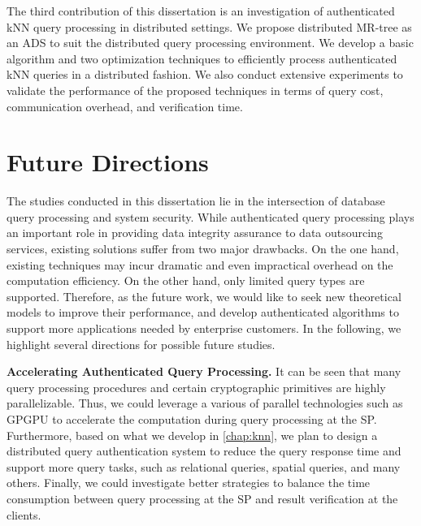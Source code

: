 The third contribution of this dissertation is an investigation of authenticated kNN query processing in distributed settings. We propose distributed MR-tree as an ADS to suit the distributed query processing environment. We develop a basic algorithm and two optimization techniques to efficiently process authenticated kNN queries in a distributed fashion. We also conduct extensive experiments to validate the performance of the proposed techniques in terms of query cost, communication overhead, and verification time.

\section{Future Directions}

The studies conducted in this dissertation lie in the intersection of database query processing and system security. While authenticated query processing plays an important role in providing data integrity assurance to data outsourcing services, existing solutions suffer from two major drawbacks. On the one hand, existing techniques may incur dramatic and even impractical overhead on the computation efficiency. On the other hand, only limited query types are supported. Therefore, as the future work, we would like to seek new theoretical models to improve their performance, and develop authenticated algorithms to support more applications needed by enterprise customers. In the following, we highlight several directions for possible future studies.

\textbf{Accelerating Authenticated Query Processing.}
It can be seen that many query processing procedures and certain cryptographic primitives are highly parallelizable. Thus, we could leverage a various of parallel technologies such as GPGPU to accelerate the computation during query processing at the SP\@. Furthermore, based on what we develop in \cref{chap:knn}, we plan to design a distributed query authentication system to reduce the query response time and support more query tasks, such as relational queries, spatial queries, and many others. Finally, we could investigate better strategies to balance the time consumption between query processing at the SP and result verification at the clients.

